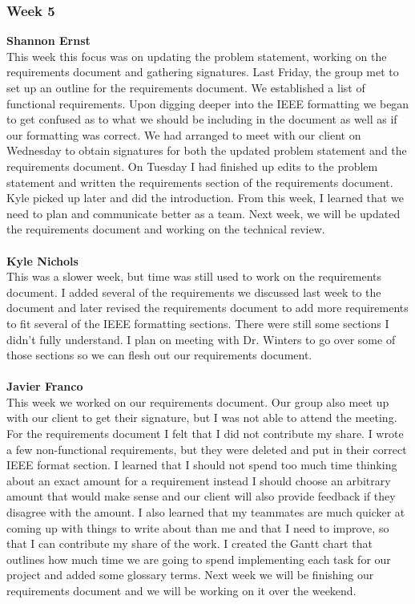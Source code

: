 \documentclass[../final.tex]{subfiles}
\begin{document}
\subsubsection{Week 5}
\textbf{Shannon Ernst}\\
This week this focus was on updating the problem statement, working on the requirements document and gathering signatures. Last Friday, the group met to set up an outline for the requirements document. We established a list of functional requirements. Upon digging deeper into the IEEE formatting we began to get confused as to what we should be including in the document as well as if our formatting was correct. We had arranged to meet with our client on Wednesday to obtain signatures for both the updated problem statement and the requirements document. On Tuesday I had finished up edits to the problem statement and written the requirements section of the requirements document. Kyle picked up later and did the introduction. From this week, I learned that we need to plan and communicate better as a team. Next week, we will be updated the requirements document and working on the technical review. \\ \\
\textbf{Kyle Nichols}\\ 
This was a slower week, but time was still used to work on the requirements document. I added several of the requirements we discussed last week to the document and later revised the requirements document to add more requirements to fit several of the IEEE formatting sections. There were still some sections I didn't fully understand. I plan on meeting with Dr. Winters to go over some of those sections so we can flesh out our requirements document.\\ \\
\textbf{Javier Franco}\\
This week we worked on our requirements document. Our group also meet up with our client to get their signature, but I was not able to attend the meeting. For the requirements document I felt that I did not contribute my share. I wrote a few non-functional requirements, but they were deleted and put in their correct IEEE format section. I learned that I should not spend too much time thinking about an exact amount for a requirement instead I should choose an arbitrary amount that would make sense and our client will also provide feedback if they disagree with the amount. I also learned that my teammates are much quicker at coming up with things to write about than me and that I need to improve, so that I can contribute my share of the work. I created the Gantt chart that outlines how much time we are going to spend implementing each task for our project and added some glossary terms. Next week we will be finishing our requirements document and we will be working on it over the weekend. \\
\end{document}
